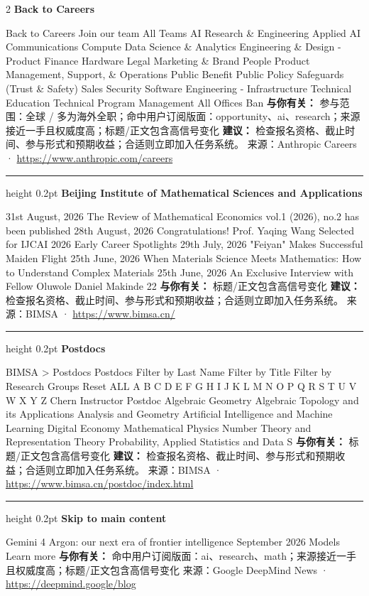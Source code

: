 \documentclass[10.5pt]{ctexart}
\begin{document}
\begin{multicols}{2}
{\large\bfseries Back to Careers}\par
Back to Careers Join our team All Teams AI Research \& Engineering Applied AI Communications Compute Data Science \& Analytics Engineering \& Design - Product Finance Hardware Legal Marketing \& Brand People Product Management, Support, \& Operations Public Benefit Public Policy Safeguards (Trust \& Safety) Sales Security Software Engineering - Infrastructure Technical Education Technical Program Management All Offices Ban
\textbf{与你有关：} 参与范围：全球 / 多为海外全职；命中用户订阅版面：opportunity、ai、research；来源接近一手且权威度高；标题/正文包含高信号变化
\textbf{建议：} 检查报名资格、截止时间、参与形式和预期收益；合适则立即加入任务系统。
{\footnotesize\color{ormuted} 来源：Anthropic Careers · \url{https://www.anthropic.com/careers}}
\vspace{2mm}
\hrule height 0.2pt
\vspace{2mm}
{\large\bfseries Beijing Institute of Mathematical Sciences and Applications}\par
31st August, 2026 The Review of Mathematical Economics vol.1 (2026), no.2 has been published 28th August, 2026 Congratulations! Prof. Yaqing Wang Selected for IJCAI 2026 Early Career Spotlights 29th July, 2026 "Feiyan" Makes Successful Maiden Flight 25th June, 2026 When Materials Science Meets Mathematics: How to Understand Complex Materials 25th June, 2026 An Exclusive Interview with Fellow Oluwole Daniel Makinde 22
\textbf{与你有关：} 标题/正文包含高信号变化
\textbf{建议：} 检查报名资格、截止时间、参与形式和预期收益；合适则立即加入任务系统。
{\footnotesize\color{ormuted} 来源：BIMSA · \url{https://www.bimsa.cn/}}
\vspace{2mm}
\hrule height 0.2pt
\vspace{2mm}
{\large\bfseries Postdocs}\par
BIMSA > Postdocs Postdocs Filter by Last Name Filter by Title Filter by Research Groups Reset ALL A B C D E F G H I J K L M N O P Q R S T U V W X Y Z Chern Instructor Postdoc Algebraic Geometry Algebraic Topology and its Applications Analysis and Geometry Artificial Intelligence and Machine Learning Digital Economy Mathematical Physics Number Theory and Representation Theory Probability, Applied Statistics and Data S
\textbf{与你有关：} 标题/正文包含高信号变化
\textbf{建议：} 检查报名资格、截止时间、参与形式和预期收益；合适则立即加入任务系统。
{\footnotesize\color{ormuted} 来源：BIMSA · \url{https://www.bimsa.cn/postdoc/index.html}}
\vspace{2mm}
\hrule height 0.2pt
\vspace{2mm}
{\large\bfseries Skip to main content}\par
Gemini 4 Argon: our next era of frontier intelligence September 2026 Models Learn more
\textbf{与你有关：} 命中用户订阅版面：ai、research、math；来源接近一手且权威度高；标题/正文包含高信号变化
{\footnotesize\color{ormuted} 来源：Google DeepMind News · \url{https://deepmind.google/blog}}
\end{multicols}
\end{document}
